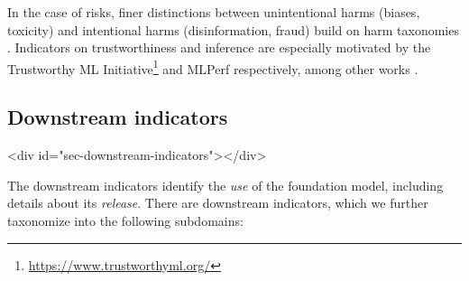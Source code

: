 \documentclass[screen, authorversion, acmsmall]{acmart}
\begin{document}
In the case of risks, finer distinctions between unintentional harms (\eg biases, toxicity) and intentional harms (\eg disinformation, fraud) build on harm taxonomies \citep{bender2021dangers, bommasani2021opportunities, weidinger2021ethical, nist2023airmf, weidinger2023sociotechnical}.
Indicators on trustworthiness and inference are especially motivated by the Trustworthy ML Initiative\footnote{\url{https://www.trustworthyml.org/}} and MLPerf \citep{reddi2020mlperf} respectively, among other works \citep{brundage2020toward, cammarota2020trustworthy, kumar2020trustworthy, liu2022trustworthy, shneiderman2020bridging, patterson2021carbon, narayanan2023cheaply}.

\hypertarget{downstream-indicators}{\subsection{Downstream indicators}}
<div id="sec-downstream-indicators"></div>

The downstream indicators identify the \emph{use} of the foundation model, including details about its \textit{release}.
There are \numdownstreamindicators downstream indicators, which we further taxonomize into the following \numdownstreamsubdomains subdomains:
\end{document}
